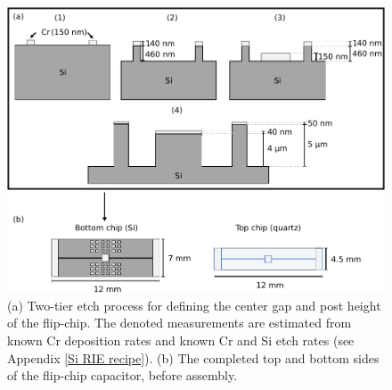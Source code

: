 \documentclass{beavtex_dub_edit}
\begin{document}
\begin{figure}
    \includegraphics[width=1\textwidth]{Two-tier etch.pdf}
    \caption{(a) Two-tier etch process for defining the center gap and post height of the flip-chip. The denoted measurements are estimated from known Cr deposition rates and known Cr and Si etch rates (see Appendix \ref{Si RIE recipe}). (b) The completed top and bottom sides of the flip-chip capacitor, before assembly.}
    \label{twotier}
\end{figure}
\end{document}
